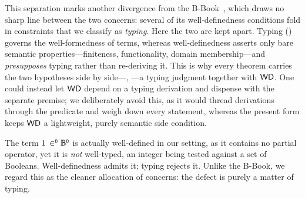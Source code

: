 \begin{remark}
  This separation marks another divergence from the B-Book~\cite{abrial1996bbook}, which draws no sharp
  line between the two concerns: several of its well-definedness conditions fold in constraints
  that we classify as \emph{typing}. Here the two are kept apart. Typing ()
  governs the well-formedness of terms, whereas well-definedness asserts only bare semantic
  properties---finiteness, functionality, domain membership---and \emph{presupposes} typing rather
  than re-deriving it. This is why every theorem carries the two hypotheses side by side---\eg{}, ---a typing judgment together with
  \(\mathsf{WD}\). One could instead let \(\mathsf{WD}\) depend on a typing derivation and dispense with the
  separate premise; we deliberately avoid this, as it would thread derivations through the
  predicate and weigh down every statement, whereas the present form keeps \(\mathsf{WD}\) a lightweight,
  purely semantic side condition.
\end{remark}

\begin{example}
  The term \(1 \mathrel{\,\in^{\scriptscriptstyle{\mathsf{B}}}} \mathbb{B}^{\scriptscriptstyle{\mathsf{B}}}\) is actually well-defined in our setting, as it contains no partial
  operator, yet it is \emph{not} well-typed, an integer being tested against a set of Booleans.
  Well-definedness admits it; typing rejects it. Unlike the B-Book, we regard this as the cleaner
  allocation of concerns: the defect is purely a matter of typing.
\end{example}
